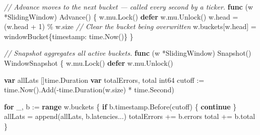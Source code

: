 \documentclass[
]{article}
\newenvironment{Shaded}{}{}
\newcommand{\BuiltInTok}[1]{\textcolor[rgb]{0.00,0.50,0.00}{#1}}
\newcommand{\CommentTok}[1]{\textcolor[rgb]{0.38,0.63,0.69}{\textit{#1}}}
\newcommand{\ControlFlowTok}[1]{\textcolor[rgb]{0.00,0.44,0.13}{\textbf{#1}}}
\newcommand{\DataTypeTok}[1]{\textcolor[rgb]{0.56,0.13,0.00}{#1}}
\newcommand{\DecValTok}[1]{\textcolor[rgb]{0.25,0.63,0.44}{#1}}
\newcommand{\KeywordTok}[1]{\textcolor[rgb]{0.00,0.44,0.13}{\textbf{#1}}}
\newcommand{\NormalTok}[1]{#1}
\newcommand{\OperatorTok}[1]{\textcolor[rgb]{0.40,0.40,0.40}{#1}}
\begin{document}
\begin{Shaded}
\begin{Highlighting}[]
\CommentTok{// Advance moves to the next bucket — called every second by a ticker.}
\KeywordTok{func} \OperatorTok{(}\NormalTok{w }\OperatorTok{*}\NormalTok{SlidingWindow}\OperatorTok{)}\NormalTok{ Advance}\OperatorTok{()} \OperatorTok{\{}
\NormalTok{    w}\OperatorTok{.}\NormalTok{mu}\OperatorTok{.}\NormalTok{Lock}\OperatorTok{()}
    \ControlFlowTok{defer}\NormalTok{ w}\OperatorTok{.}\NormalTok{mu}\OperatorTok{.}\NormalTok{Unlock}\OperatorTok{()}
\NormalTok{    w}\OperatorTok{.}\NormalTok{head }\OperatorTok{=} \OperatorTok{(}\NormalTok{w}\OperatorTok{.}\NormalTok{head }\OperatorTok{+} \DecValTok{1}\OperatorTok{)} \OperatorTok{\%}\NormalTok{ w}\OperatorTok{.}\NormalTok{size}
    \CommentTok{// Clear the bucket being overwritten}
\NormalTok{    w}\OperatorTok{.}\NormalTok{buckets}\OperatorTok{[}\NormalTok{w}\OperatorTok{.}\NormalTok{head}\OperatorTok{]} \OperatorTok{=}\NormalTok{ windowBucket}\OperatorTok{\{}\NormalTok{timestamp}\OperatorTok{:}\NormalTok{ time}\OperatorTok{.}\NormalTok{Now}\OperatorTok{()\}}
\OperatorTok{\}}

\CommentTok{// Snapshot aggregates all active buckets.}
\KeywordTok{func} \OperatorTok{(}\NormalTok{w }\OperatorTok{*}\NormalTok{SlidingWindow}\OperatorTok{)}\NormalTok{ Snapshot}\OperatorTok{()}\NormalTok{ WindowSnapshot }\OperatorTok{\{}
\NormalTok{    w}\OperatorTok{.}\NormalTok{mu}\OperatorTok{.}\NormalTok{Lock}\OperatorTok{()}
    \ControlFlowTok{defer}\NormalTok{ w}\OperatorTok{.}\NormalTok{mu}\OperatorTok{.}\NormalTok{Unlock}\OperatorTok{()}

    \KeywordTok{var}\NormalTok{ allLats }\OperatorTok{[]}\NormalTok{time}\OperatorTok{.}\NormalTok{Duration}
    \KeywordTok{var}\NormalTok{ totalErrors}\OperatorTok{,}\NormalTok{ total }\DataTypeTok{int64}
\NormalTok{    cutoff }\OperatorTok{:=}\NormalTok{ time}\OperatorTok{.}\NormalTok{Now}\OperatorTok{().}\NormalTok{Add}\OperatorTok{({-}}\NormalTok{time}\OperatorTok{.}\NormalTok{Duration}\OperatorTok{(}\NormalTok{w}\OperatorTok{.}\NormalTok{size}\OperatorTok{)} \OperatorTok{*}\NormalTok{ time}\OperatorTok{.}\NormalTok{Second}\OperatorTok{)}

    \ControlFlowTok{for}\NormalTok{ \_}\OperatorTok{,}\NormalTok{ b }\OperatorTok{:=} \KeywordTok{range}\NormalTok{ w}\OperatorTok{.}\NormalTok{buckets }\OperatorTok{\{}
        \ControlFlowTok{if}\NormalTok{ b}\OperatorTok{.}\NormalTok{timestamp}\OperatorTok{.}\NormalTok{Before}\OperatorTok{(}\NormalTok{cutoff}\OperatorTok{)} \OperatorTok{\{}
            \ControlFlowTok{continue}
        \OperatorTok{\}}
\NormalTok{        allLats }\OperatorTok{=} \BuiltInTok{append}\OperatorTok{(}\NormalTok{allLats}\OperatorTok{,}\NormalTok{ b}\OperatorTok{.}\NormalTok{latencies}\OperatorTok{...)}
\NormalTok{        totalErrors }\OperatorTok{+=}\NormalTok{ b}\OperatorTok{.}\NormalTok{errors}
\NormalTok{        total }\OperatorTok{+=}\NormalTok{ b}\OperatorTok{.}\NormalTok{total}
    \OperatorTok{\}}


\end{Highlighting}
\end{Shaded}
\end{document}
